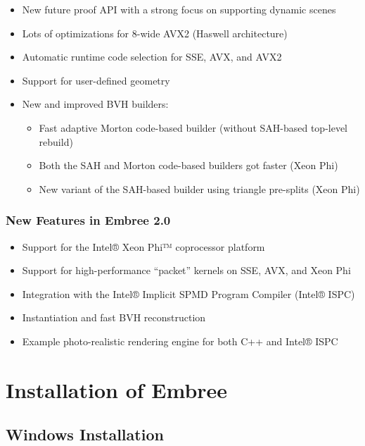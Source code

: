 \begin{itemize}
\tightlist
\item
  New future proof API with a strong focus on supporting dynamic scenes
\item
  Lots of optimizations for 8-wide AVX2 (Haswell architecture)
\item
  Automatic runtime code selection for SSE, AVX, and AVX2
\item
  Support for user-defined geometry
\item
  New and improved BVH builders:

  \begin{itemize}
  \tightlist
  \item
    Fast adaptive Morton code-based builder (without SAH-based top-level
    rebuild)
  \item
    Both the SAH and Morton code-based builders got faster (Xeon Phi)
  \item
    New variant of the SAH-based builder using triangle pre-splits (Xeon
    Phi)
  \end{itemize}
\end{itemize}

\subsection{New Features in Embree
2.0}\label{new-features-in-embree-2.0}

\begin{itemize}
\tightlist
\item
  Support for the Intel® Xeon Phi™ coprocessor platform
\item
  Support for high-performance ``packet'' kernels on SSE, AVX, and Xeon
  Phi
\item
  Integration with the Intel® Implicit SPMD Program Compiler (Intel®
  ISPC)
\item
  Instantiation and fast BVH reconstruction
\item
  Example photo-realistic rendering engine for both C++ and Intel® ISPC
\end{itemize}

\chapter{Installation of Embree}\label{installation-of-embree}

\section{Windows Installation}\label{windows-installation}

